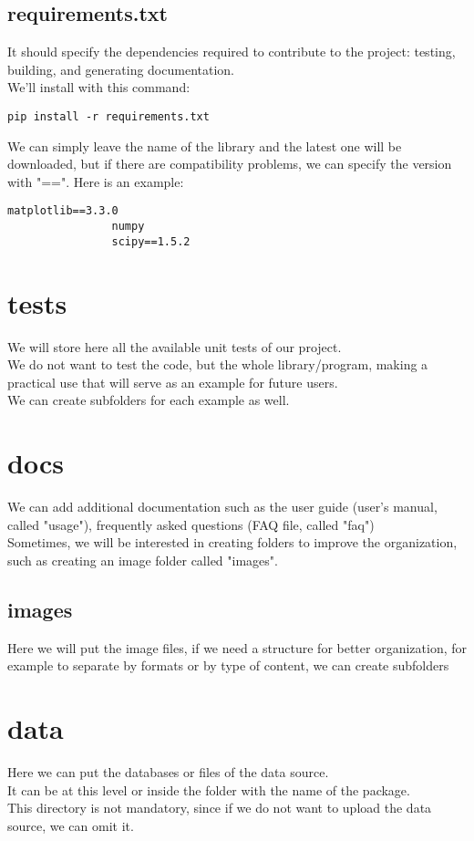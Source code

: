\documentclass[a4paper]{article}
\begin{document}
		\subsection{requirements.txt}
			It should specify the dependencies required to contribute to the project: testing, building, and generating documentation.\\
			We'll install with this command:
			\begin{lstlisting}[caption=requirements.txt, label=lst:exampleRequeriments]
				pip install -r requirements.txt
			\end{lstlisting}
			We can simply leave the name of the library and the latest one will be downloaded, but if there are compatibility problems, we can specify the version with "==". Here is an example:\\
			\begin{lstlisting}[caption=requirements.txt, label=lst:exampleRequeriments]
				matplotlib==3.3.0
				numpy
				scipy==1.5.2
			\end{lstlisting} 
	\section{tests}
		We will store here all the available unit tests of our project.\\
		We do not want to test the code, but the whole library/program, making a practical use that will serve as an example for future users.\\
		We can create subfolders for each example as well.
	\section{docs}
		We can add additional documentation such as the user guide (user's manual, called "usage"), frequently asked questions (FAQ file, called "faq")\\
		Sometimes, we will be interested in creating folders to improve the organization, such as creating an image folder called "images".\\ 
		\subsection{images}
			Here we will put the image files, if we need a structure for better organization, for example to separate by formats or by type of content, we can create subfolders
	\section{data}
		Here we can put the databases or files of the data source.\\
		It can be at this level or inside the folder with the name of the package.\\
		This directory is not mandatory, since if we do not want to upload the data source, we can omit it.\\
\end{document}
